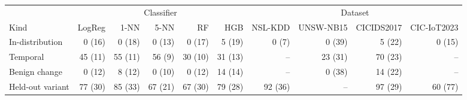 \begin{tabular}{lrrrrrrrrr}
\toprule
 & \multicolumn{5}{c}{Classifier} & \multicolumn{4}{c}{Dataset} \\ \cmidrule(lr){2-6}\cmidrule(lr){7-10}
Kind & LogReg & 1-NN & 5-NN & RF & HGB & NSL-KDD & UNSW-NB15 & CICIDS2017 & CIC-IoT2023 \\
\midrule
In-distribution & 0 (16) & 0 (18) & 0 (13) & 0 (17) & 5 (19) & 0 (7) & 0 (39) & 5 (22) & 0 (15) \\
Temporal & 45 (11) & 55 (11) & 56 (9) & 30 (10) & 31 (13) & -- & 23 (31) & 70 (23) & -- \\
Benign change & 0 (12) & 8 (12) & 0 (10) & 0 (12) & 14 (14) & -- & 0 (38) & 14 (22) & -- \\
Held-out variant & 77 (30) & 85 (33) & 67 (21) & 67 (30) & 79 (28) & 92 (36) & -- & 97 (29) & 60 (77) \\
\bottomrule
\end{tabular}
